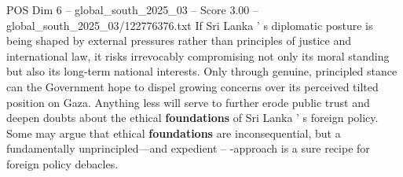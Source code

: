 \begin{textsample}{POS Dim 6 – global\_south\_2025\_03 – Score 3.00 – global\_south\_2025\_03/122776376.txt}
If Sri Lanka ' s diplomatic posture is being shaped by external pressures rather than principles of justice and international law, it risks irrevocably compromising not only its moral standing but also its long-term national interests.
Only through genuine, principled stance can the Government hope to dispel growing concerns over its perceived tilted position on Gaza.
Anything less will serve to further erode public trust and deepen doubts about the ethical \textbf{foundations} of Sri Lanka ' s foreign policy.
Some may argue that ethical \textbf{foundations} are inconsequential, but a fundamentally unprincipled---and expedient -- -approach is a sure recipe for foreign policy debacles.

\end{textsample}
